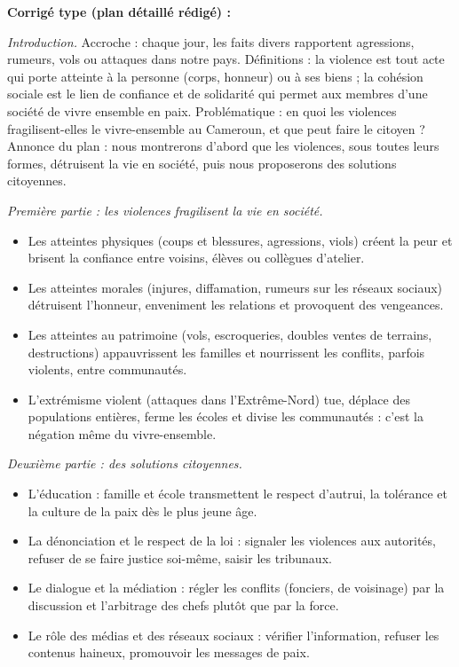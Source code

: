\documentclass[11pt]{article}
\newcommand{\cle}[1]{{\popxbold\color{popdark}#1}}
\begin{document}
\begin{corrige}
\textbf{Corrigé type (plan détaillé rédigé) :}

\emph{Introduction.} Accroche : chaque jour, les faits divers rapportent agressions, rumeurs, vols ou attaques dans notre pays. Définitions : la \cle{violence} est tout acte qui porte atteinte à la personne (corps, honneur) ou à ses biens ; la \cle{cohésion sociale} est le lien de confiance et de solidarité qui permet aux membres d'une société de vivre ensemble en paix. Problématique : en quoi les violences fragilisent-elles le vivre-ensemble au Cameroun, et que peut faire le citoyen ? Annonce du plan : nous montrerons d'abord que les violences, sous toutes leurs formes, détruisent la vie en société, puis nous proposerons des solutions citoyennes.

\emph{Première partie : les violences fragilisent la vie en société.}
\begin{itemize}
\item Les atteintes \cle{physiques} (coups et blessures, agressions, viols) créent la peur et brisent la confiance entre voisins, élèves ou collègues d'atelier.
\item Les atteintes \cle{morales} (injures, diffamation, rumeurs sur les réseaux sociaux) détruisent l'honneur, enveniment les relations et provoquent des vengeances.
\item Les atteintes au \cle{patrimoine} (vols, escroqueries, doubles ventes de terrains, destructions) appauvrissent les familles et nourrissent les conflits, parfois violents, entre communautés.
\item L'\cle{extrémisme violent} (attaques dans l'Extrême-Nord) tue, déplace des populations entières, ferme les écoles et divise les communautés : c'est la négation même du vivre-ensemble.
\end{itemize}

\emph{Deuxième partie : des solutions citoyennes.}
\begin{itemize}
\item L'\cle{éducation} : famille et école transmettent le respect d'autrui, la tolérance et la culture de la paix dès le plus jeune âge.
\item La \cle{dénonciation} et le respect de la loi : signaler les violences aux autorités, refuser de se faire justice soi-même, saisir les tribunaux.
\item Le \cle{dialogue} et la médiation : régler les conflits (fonciers, de voisinage) par la discussion et l'arbitrage des chefs plutôt que par la force.
\item Le rôle des \cle{médias et des réseaux sociaux} : vérifier l'information, refuser les contenus haineux, promouvoir les messages de paix.
\end{itemize}


\end{corrige}
\end{document}
